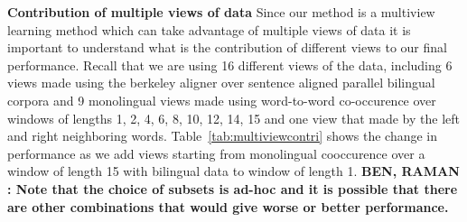\documentclass[11pt]{article}
\newcommand{\cwindow}{1, 2, 4, 6, 8, 10, 12, 14, 15}
\newcommand{\cwinlen}{9}
\newcommand{\ctotalview}{16}
\begin{document}
\textbf{Contribution of multiple views of data}
Since our method is a multiview learning method which can take
advantage of multiple views of data it is important to understand what
is the contribution of different views to our final
performance. Recall that we are using \ctotalview{} different views of the data,
including 6 views made using the berkeley
aligner over sentence aligned parallel bilingual corpora and
\cwinlen{} monolingual views made using word-to-word 
co-occurence over windows of lengths
\cwindow{} and one view that made by the left and right
neighboring words. Table~\ref{tab:multiviewcontri} shows the change in
performance as we add views starting from monolingual cooccurence over
a window of length 15 with bilingual data to window of length 1. \textbf{BEN,
  RAMAN : Note that the choice of subsets is ad-hoc and it is possible
  that there are other combinations that would give worse or better
  performance.}
\end{document}
